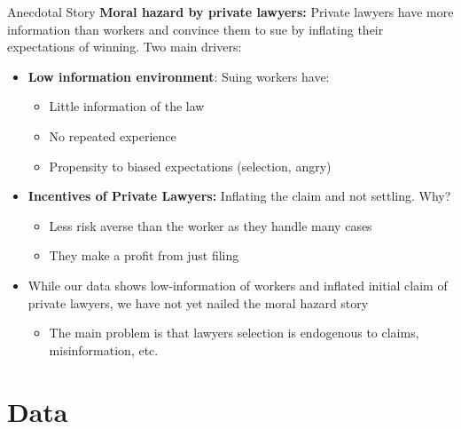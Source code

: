 \documentclass[9pt]{beamer}
\begin{document}
\begin{frame}{Anecdotal Story}
\textbf{Moral hazard by private lawyers:} Private lawyers have more information than workers and convince them to sue by inflating their expectations of winning. Two main drivers:
\vspace{0.1in}
    \begin{itemize}
        \item \textbf{Low information environment}: Suing workers have:
        \begin{itemize}
            \item Little information of the law
            \item No repeated experience
            \item Propensity to biased expectations (selection, angry)
        \end{itemize}
        \vspace{0.1in}
        \item \textbf{Incentives of Private Lawyers:} Inflating the claim and not settling. Why?
        \begin{itemize}
                \item Less risk averse than the worker as they handle many cases
                \item They make a profit from just filing 
         \end{itemize}
          \vspace{0.1in}
        \item{While our data shows low-information of workers and inflated initial claim of private lawyers, we have not yet nailed the moral hazard story} 
            \begin{itemize}
                \item The main problem is that lawyers selection is endogenous to claims, misinformation, etc.
            \end{itemize}
    \end{itemize}
\end{frame}



\section{Data}
\end{document}
